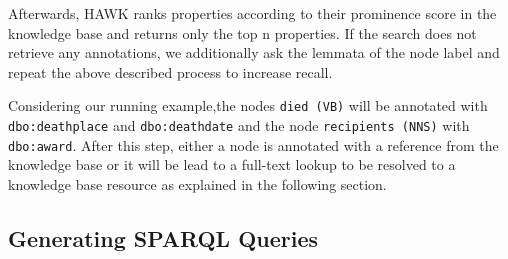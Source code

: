 Afterwards, HAWK ranks properties according to their prominence score in the knowledge base and returns only the top n properties.
If the search does not retrieve any annotations, we additionally ask the lemmata of the node label and repeat the above described process to increase recall.

Considering our running example,the nodes \texttt{died (VB)} will be annotated with \texttt{dbo:deathplace} and \texttt{dbo:deathdate} and the node \texttt{recipients (NNS)} with \texttt{dbo:award}.
After this step, either a node is annotated with a reference from the knowledge base %
or it will be lead to a full-text lookup to be resolved to a knowledge base resource as explained in the following section.


\subsection{Generating SPARQL Queries}
\label{chahawk:sec:full-text}

